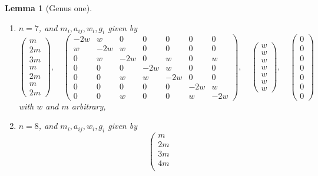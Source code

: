 \documentclass{stacks-project}
\theoremstyle{plain}
\newtheorem{lemma}[subsection]{Lemma}
\theoremstyle{definition}
\theoremstyle{remark}
\numberwithin{equation}{subsection}
\begin{document}
\begin{lemma}[Genus one]
\begin{enumerate}
\begin{enumerate}
\item $a_{13} = w$, $a_{23} = \ldots = a_{(n - 2) (n - 1)} = w$,
$a_{(n - 2) n} = w$, and for other $i < j$ we have $a_{ij} = 0$,
\item $w_1 = \ldots = w_n = w$,
\end{enumerate}
with $w$ and $m$ arbitrary,
\item
\label{item-E6-completed}
$n = 7$, and $m_i, a_{ij}, w_i, g_i$ given by
$$
\left(
\begin{matrix}
m \\
2m \\
3m \\
m \\
2m \\
m \\
2m
\end{matrix}
\right),
\quad
\left(
\begin{matrix}
-2w & w & 0 & 0 & 0 & 0 & 0 \\
w & -2w & w & 0 & 0 & 0 & 0 \\
0 & w & -2w & 0 & w & 0 & w \\
0 & 0 & 0 & -2w & w & 0 & 0 \\
0 & 0 & w & w & -2w & 0 & 0 \\
0 & 0 & 0 & 0 & 0 & -2w & w \\
0 & 0 & w & 0 & 0 & w & -2w
\end{matrix}
\right),
\quad
\left(
\begin{matrix}
w \\
w \\
w \\
w \\
w \\
w \\
w
\end{matrix}
\right),
\quad
\left(
\begin{matrix}
0 \\
0 \\
0 \\
0 \\
0 \\
0 \\
0
\end{matrix}
\right)
$$
with $w$ and $m$ arbitrary,
\item
\label{item-E7-completed}
$n = 8$, and $m_i, a_{ij}, w_i, g_i$ given by
$$
\left(
\begin{matrix}
m \\
2m \\
3m \\
4m \\

\end{matrix}$$
\end{enumerate}
\end{lemma}
\end{document}
